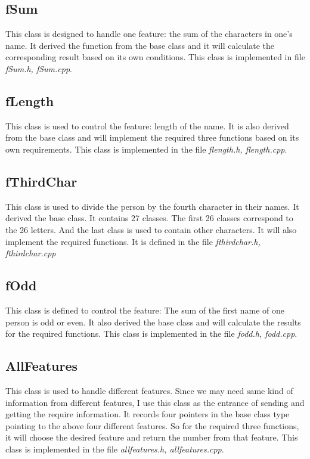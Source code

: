 \documentclass{article}
\begin{document}
		\subsection{fSum}
			This class is designed to handle one feature: the sum of the characters in one's name. It derived the function from the base class and it will calculate the corresponding result based on its own conditions.
			\newline
			This class is implemented in file \emph{fSum.h, fSum.cpp}.
		\subsection{fLength}
			This class is used to control the feature: length of the name. It is also derived from the base class and will implement the required three functions based on its own requirements.
			\newline
			This class is implemented in the file \emph{flength.h, flength.cpp}.
		\subsection{fThirdChar}
			This class is used to divide the person by the fourth character in their names. It derived the base class. It contains 27 classes. The first 26 classes correspond to the 26 letters. And the last class is used to contain other characters. It will also implement the required functions.
			\newline
			It is defined in the file \emph{fthirdchar.h, fthirdchar.cpp}
		\subsection{fOdd}
			This class is defined to control the feature: The sum of the first name of one person is odd or even. It also derived the base class and will calculate the results for the required functions.
			\newline
			This class is implemented in the file \emph{fodd.h, fodd.cpp}.
		\subsection{AllFeatures}
			This class is used to handle different features. Since we may need same kind of information from different features, I use this class as the entrance of sending and getting the require information. It records four pointers in the base class type pointing to the above four different features. So for the required three functions, it will choose the desired feature and return the number from that feature.
			\newline
			This class is implemented in the file \emph{allfeatures.h, allfeatures.cpp}.
			
\end{document}
